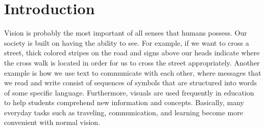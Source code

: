 
\chapter{Introduction}
\label{chap1:sec:introduction}

Vision is probably the most important of all senses that humans possess. Our society is built on having the ability to see. For example, if we want to cross a street, thick colored stripes on the road and signs above our heads indicate where the cross walk is located in order for us to cross the street appropriately. Another example is how we use text to communicate with each other, where messages that we read and write consist of sequences of symbols that are structured into words of some specific language. Furthermore, visuals are used frequently in education to help students comprehend new information and concepts. Basically, many everyday tasks such as traveling, communication, and learning become more convenient with normal vision. 


